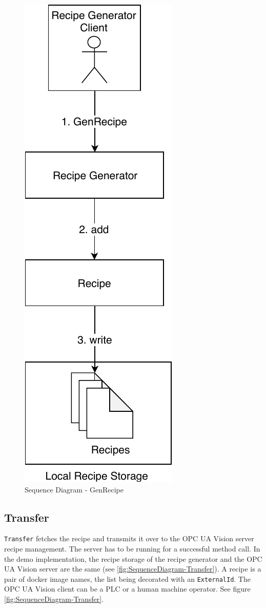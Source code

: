 \begin{figure}[ht]
	\centering
  \includegraphics[height=0.5\textheight]{img/SequenceDiagram-GenRecipe.pdf}
	\caption{Sequence Diagram - GenRecipe}
	\label{fig:SequenceDiagram-GenRecipe}
\end{figure}

\subsection{Transfer}
\texttt{Transfer} fetches the recipe and transmits it over to the OPC UA Vision server recipe management. The server has to be running for a successful method call. In the demo implementation, the recipe storage of the recipe generator and the OPC UA Vision server are the same (see \ref{fig:SequenceDiagram-Transfer}). A recipe is a pair of docker image names, the list being decorated with an \texttt{ExternalId}. The OPC UA Vision client can be a PLC or a human machine operator. See figure \ref{fig:SequenceDiagram-Transfer}.

